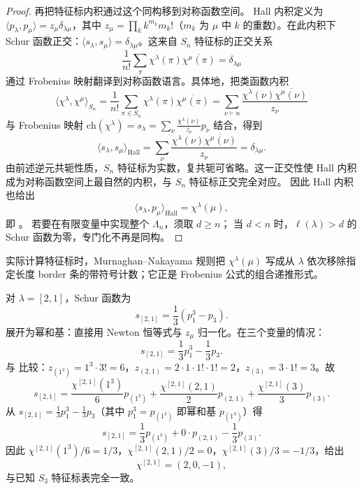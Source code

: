 \begin{proof}
再把特征标内积通过这个同构移到对称函数空间。
Hall 内积定义为 $\langle p_\lambda,p_\mu\rangle=z_\mu\delta_{\lambda\mu}$，其中 $z_\mu=\prod_k k^{m_k}m_k!$（$m_k$ 为 $\mu$ 中 $k$ 的重数）。在此内积下 Schur 函数正交：$\langle s_\lambda,s_\mu\rangle=\delta_{\lambda\mu}$。这来自 $S_n$ 特征标的正交关系
\[
\frac{1}{n!}\sum_{\pi}\chi^\lambda(\pi)\overline{\chi^\mu(\pi)}=\delta_{\lambda\mu}
\]
通过 Frobenius 映射翻译到对称函数语言。具体地，把类函数内积
\[
\langle\chi^\lambda,\chi^\mu\rangle_{S_n}
=\frac{1}{n!}\sum_{\pi\in S_n}\chi^\lambda(\pi)\overline{\chi^\mu(\pi)}
=\sum_{\nu\vdash n}\frac{\chi^\lambda(\nu)\overline{\chi^\mu(\nu)}}{z_\nu}
\]
与 Frobenius 映射 $\mathrm{ch}(\chi^\lambda)=s_\lambda=\sum_\nu\frac{\chi^\lambda(\nu)}{z_\nu}p_\nu$ 结合，得到
\[
\langle s_\lambda,s_\mu\rangle_{\mathrm{Hall}}
=\sum_{\nu}\frac{\chi^\lambda(\nu)\overline{\chi^\mu(\nu)}}{z_\nu}
=\delta_{\lambda\mu}.
\]
由前述逆元共轭性质，$S_n$ 特征标为实数，复共轭可省略。这一正交性使 Hall 内积成为对称函数空间上最自然的内积，与 $S_n$ 特征标正交完全对应。
因此 Hall 内积也给出
\[
\bigl\langle s_\lambda,p_\mu\bigr\rangle_{\mathrm{Hall}}
=\chi^\lambda(\mu),
\]
即 。
若要在有限变量中实现整个 $\Lambda_n$，须取 $d\ge n$；
当 $d<n$ 时，$\ell(\lambda)>d$ 的 Schur 函数为零，专门化不再是同构。

\end{proof}



实际计算特征标时，Murnaghan--Nakayama 规则把 $\chi^\lambda(\mu)$ 写成从 $\lambda$ 依次移除指定长度 border 条的带符号计数；它正是 Frobenius 公式的组合递推形式。

\begin{example}
对 $\lambda=[2,1]$，Schur 函数为
\[
s_{[2,1]}=\frac{1}{3}(p_1^3-p_3).
\]
展开为幂和基：直接用 Newton 恒等式与 $z_\mu$ 归一化。在三个变量的情况：
\[
s_{[2,1]}=\frac{1}{3}p_1^3-\frac{1}{3}p_3.
\]
与  比较：$z_{(1^3)}=1^3\cdot3!=6$，$z_{(2,1)}=2\cdot1\cdot1!\cdot1!=2$，$z_{(3)}=3\cdot1!=3$。故
\[
s_{[2,1]}=\frac{\chi^{[2,1]}(1^3)}{6}p_{(1^3)}+\frac{\chi^{[2,1]}(2,1)}{2}p_{(2,1)}+\frac{\chi^{[2,1]}(3)}{3}p_{(3)}.
\]
从 $s_{[2,1]}=\frac{1}{3}p_1^3-\frac{1}{3}p_3$（其中 $p_1^3=p_{(1^3)}$ 即幂和基 $p_{(1^3)}$）得
\[
s_{[2,1]}=\frac{1}{3}p_{(1^3)}+0\cdot p_{(2,1)}-\frac{1}{3}p_{(3)}.
\]
因此 $\chi^{[2,1]}(1^3)/6=1/3$，$\chi^{[2,1]}(2,1)/2=0$，$\chi^{[2,1]}(3)/3=-1/3$，给出
\[
\chi^{[2,1]}=(2,0,-1),
\]
与已知 $S_3$ 特征标表完全一致。

\end{example}

